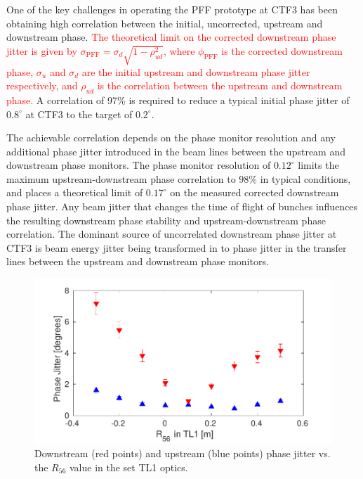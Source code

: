 \documentclass[%
 reprint,
superscriptaddress,
 amsmath,amssymb,
 prl,
]{revtex4-1}
\begin{document}
One of the key challenges in operating the PFF prototype at CTF3 has been 
obtaining high correlation between the initial, uncorrected, upstream and 
downstream phase. \textcolor{red}{The theoretical limit on the corrected 
downstream phase jitter is given by
\(\sigma_{\mathrm{PFF}}=\sigma_d \sqrt{1-\rho_{ud}^2}\), where 
\(\phi_{\mathrm{PFF}}\) is the corrected downstream phase, \(\sigma_u\) and 
\(\sigma_d\) are the initial upstream and downstream 
phase jitter respectively, and \(\rho_{ud}\) is the correlation between the 
upstream and downstream phase.} A correlation of 97\% is required to reduce a 
typical initial 
phase jitter of \(0.8^\circ\) at CTF3 to the target of \(0.2^\circ\). 

The achievable correlation depends on the phase monitor resolution and any 
additional phase jitter introduced in the beam lines between the upstream and 
downstream phase monitors. The phase monitor resolution of \(0.12^\circ\) 
limits the maximum upstream-downstream phase correlation to
\(98\%\) in typical conditions, and places a theoretical limit of
\(0.17^\circ\) on the measured corrected downstream phase 
jitter. 
Any beam jitter that changes the time of flight of bunches influences the 
resulting downstream phase stability and upstream-downstream phase correlation. 
The dominant source of uncorrelated downstream phase jitter at CTF3 is beam 
energy jitter being transformed in to phase jitter in the transfer lines 
between the upstream and downstream phase monitors.

\begin{figure}
	\includegraphics[width=\columnwidth]{figs/r56Scan}%
	\caption{\label{fig:r56Scan}Downstream (red points) and upstream (blue 
		points) phase jitter vs. the \(R_{56}\) value in the set TL1 optics. 
		}
\end{figure}
\end{document}
